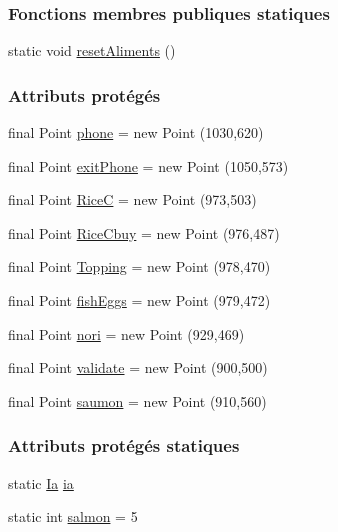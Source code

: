 \subsubsection*{Fonctions membres publiques statiques}
\begin{DoxyCompactItemize}
\item 
static void \hyperlink{classSuchi_1_1Recette_a99446c824f7bffe26c36e8433a4b18b3}{reset\+Aliments} ()
\end{DoxyCompactItemize}
\subsubsection*{Attributs protégés}
\begin{DoxyCompactItemize}
\item 
final Point \hyperlink{classSuchi_1_1Recette_a89465932bd180079526cfc1f8b8af456}{phone} = new Point (1030,620)
\item 
final Point \hyperlink{classSuchi_1_1Recette_ac7ff51ea8fa06174c38c52121b0ef767}{exit\+Phone} = new Point (1050,573)
\item 
final Point \hyperlink{classSuchi_1_1Recette_a36ec8dc3a30b3f1dba74d3aa354f9f11}{Rice\+C} = new Point (973,503)
\item 
final Point \hyperlink{classSuchi_1_1Recette_afc63b1a3fa7d921d606dc0c99d52cdf4}{Rice\+Cbuy} = new Point (976,487)
\item 
final Point \hyperlink{classSuchi_1_1Recette_a4810b2254c050209fba27757066668b3}{Topping} = new Point (978,470)
\item 
final Point \hyperlink{classSuchi_1_1Recette_a9d19fcc0de54e124694592bc35d97a1d}{fish\+Eggs} = new Point (979,472)
\item 
final Point \hyperlink{classSuchi_1_1Recette_ab86193f9fe4491190e232c4e7f93bed5}{nori} = new Point (929,469)
\item 
final Point \hyperlink{classSuchi_1_1Recette_aff16265c9b0b819091af71f64ef84be7}{validate} = new Point (900,500)
\item 
final Point \hyperlink{classSuchi_1_1Recette_a17aeabd21e3d4d55d7caae9a40bfc6a1}{saumon} = new Point (910,560)
\end{DoxyCompactItemize}
\subsubsection*{Attributs protégés statiques}
\begin{DoxyCompactItemize}
\item 
static \hyperlink{classSuchi_1_1Ia}{Ia} \hyperlink{classSuchi_1_1Recette_add9d95ee8955e02592b553c7e4b719a0}{ia}
\item 
static int \hyperlink{classSuchi_1_1Recette_a2e9711072decb1bd2a64a4328e566d73}{salmon} = 5
\end{DoxyCompactItemize}
